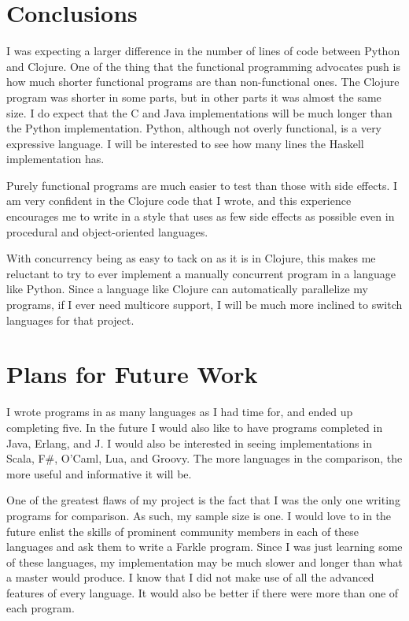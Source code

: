 \documentclass{article}
\begin{document}
\section{Conclusions}

I was expecting a larger difference in the number of lines of code between
Python and Clojure.  One of the thing that the functional programming advocates
push is how much shorter functional programs are than non-functional ones.  The
Clojure program was shorter in some parts, but in other parts it was almost the
same size.  I do expect that the C and Java implementations will be much longer
than the Python implementation.  Python, although not overly functional, is a very
expressive language.  I will be interested to see how many lines the Haskell
implementation has.

Purely functional programs are much easier to test than those with side effects.
I am very confident in the Clojure code that I wrote, and this experience
encourages me to write in a style that uses as few side effects as possible
even in procedural and object-oriented languages.

With concurrency being as easy to tack on as it is in Clojure, this makes me
reluctant to try to ever implement a manually concurrent program in a language
like Python.  Since a language like Clojure can automatically parallelize my
programs, if I ever need multicore support, I will be much more inclined to
switch languages for that project.

\section{Plans for Future Work}

I wrote programs in as many languages as I had time for, and ended up completing
five.  In the future I would also like to have programs completed in Java,
Erlang, and J.  I would also be interested in seeing implementations in Scala,
F\#, O'Caml, Lua, and Groovy.  The more languages in the comparison, the more
useful and informative it will be.

One of the greatest flaws of my project is the fact that I was the only one
writing programs for comparison.  As such, my sample size is one.  I would love
to in the future enlist the skills of prominent community members in each of
these languages and ask them to write a Farkle program.  Since I was just
learning some of these languages, my implementation may be much slower and
longer than what a master would produce.  I know that I did not make use of all
the advanced features of every language.  It would also be better if there were
more than one of each program.
\end{document}

